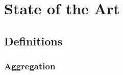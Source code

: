\documentclass[12pt, oneside, a4paper]{scrbook}
\begin{document}







\chapter{State of the Art}
\label{chap:stateoftheart}
\section{Definitions}
\label{sec:definitions}

\subsection*{Aggregation}
\end{document}
